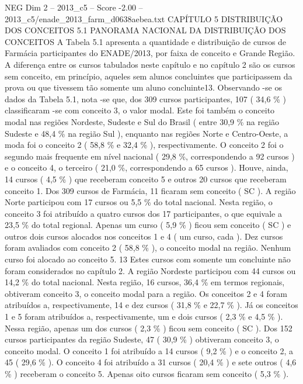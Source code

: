 \begin{textsample}{NEG Dim 2 – 2013\_c5 – Score -2.00 – 2013\_c5/enade\_2013\_farm\_d0638aebea.txt}  \label{ex:f2_neg_064}
CAPÍTULO 5 DISTRIBUIÇÃO DOS CONCEITOS 5.1 PANORAMA NACIONAL DA DISTRIBUIÇÃO DOS CONCEITOS A Tabela 5.1 apresenta a quantidade e distribuição de cursos de Farmácia participantes do ENADE/2013, por faixa de conceito e Grande Região.
A diferença entre os cursos tabulados neste capítulo e no capítulo 2 são os cursos sem conceito, em princípio, aqueles sem alunos concluintes que participassem da prova ou que tivessem tão somente um aluno concluinte13.
Observando -se os dados da Tabela 5.1, nota -se que, dos 309 cursos participantes, 107 ( 34,6 \% ) classificaram -se com conceito 3, o valor modal.
Este foi também o conceito modal nas regiões Nordeste, Sudeste e Sul do Brasil ( entre 30,9 \% na região Sudeste e 48,4 \% na região Sul ), enquanto nas regiões Norte e Centro-Oeste, a moda foi o conceito 2 ( 58,8 \% e 32,4 \% ), respectivamente.
O conceito 2 foi o segundo mais frequente em nível nacional ( 29,8 \%, correspondendo a 92 cursos ) e o conceito 4, o terceiro ( 21,0 \%, correspondendo a 65 cursos ).
Houve, ainda, 14 cursos ( 4,5 \% ) que receberam conceito 5 e outros 20 cursos que receberam conceito 1.
Dos 309 cursos de Farmácia, 11 ficaram sem conceito ( SC ).
A região Norte participou com 17 cursos ou 5,5 \% do total nacional.
Nesta região, o conceito 3 foi atribuído a quatro cursos dos 17 participantes, o que equivale a 23,5 \% do total regional.
Apenas um curso ( 5,9 \% ) ficou sem conceito ( SC ) e outros dois cursos alocados nos conceitos 1 e 4 ( um curso, cada ).
Dez cursos foram avaliados com conceito 2 ( 58,8 \% ), o conceito modal na região.
Nenhum curso foi alocado ao conceito 5. 13 Estes cursos com somente um concluinte não foram considerados no capítulo 2.
A região Nordeste participou com 44 cursos ou 14,2 \% do total nacional.
Nesta região, 16 cursos, 36,4 \% em termos regionais, obtiveram conceito 3, o conceito modal para a região.
Os conceitos 2 e 4 foram atribuídos a, respectivamente, 14 e dez cursos ( 31,8 \% e 22,7 \% ).
Já os conceitos 1 e 5 foram atribuídos a, respectivamente, um e dois cursos ( 2,3 \% e 4,5 \% ).
Nessa região, apenas um dos cursos ( 2,3 \% ) ficou sem conceito ( SC ).
Dos 152 cursos participantes da região Sudeste, 47 ( 30,9 \% ) obtiveram conceito 3, o conceito modal.
O conceito 1 foi atribuído a 14 cursos ( 9,2 \% ) e o conceito 2, a 45 ( 29,6 \% ).
O conceito 4 foi atribuído a 31 cursos ( 20,4 \% ) e sete outros ( 4,6 \% ) receberam o conceito 5.
Apenas oito cursos ficaram sem conceito ( 5,3 \% ).

\end{textsample}
